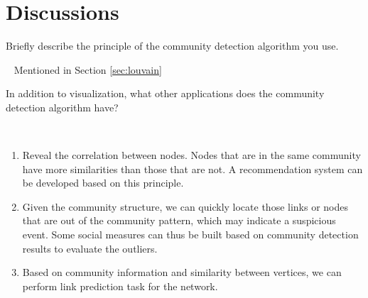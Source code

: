 \section{Discussions}

\begin{exercise}[]{Briefly describe the principle of the community detection algorithm you use.}
  \begin{solution}
  \par{~} Mentioned in Section \ref{sec:louvain}
  \end{solution}
  \label{ex1}
\end{exercise}


\begin{exercise}[]{In addition to visualization, what other applications does the community detection algorithm have?}
  \begin{solution}
  \par{~}
  \begin{enumerate}
      \item Reveal the correlation between nodes. Nodes that are in the same community have more similarities than those that are not. A recommendation system can be developed based on this principle.
      \item Given the community structure, we can quickly locate those links or nodes that are out of the community pattern, which may indicate a suspicious event. Some social measures can thus be built based on community detection results to evaluate the outliers.
      \item Based on community information and similarity between vertices, we can perform link prediction task for the network.
  \end{enumerate}
  \end{solution}
  \label{ex2}
\end{exercise}
